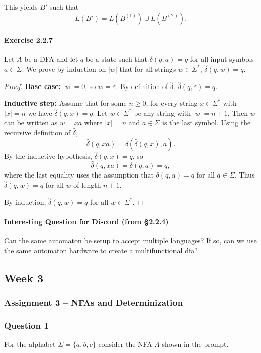 \documentclass[11pt, a4paper]{article}
\theoremstyle{definition}
\theoremstyle{remark}
\begin{document}
This yields $B'$ such that
\[
L(B') = L(B^{(1)}) \cup L(B^{(2)}).
\]


\paragraph{Exercise 2.2.7}
Let $A$ be a DFA and let $q$ be a state such that $\delta(q,a)=q$ for all input symbols $a\in\Sigma$.
We prove by induction on $|w|$ that for all strings $w\in\Sigma^*$, $\hat{\delta}(q,w)=q$.

\begin{proof}
\textbf{Base case:} $|w|=0$, so $w=\varepsilon$.
By definition of $\hat{\delta}$, $\hat{\delta}(q,\varepsilon)=q$.

\textbf{Inductive step:} Assume that for some $n\ge 0$, for every string $x\in\Sigma^*$ with $|x|=n$ we have $\hat{\delta}(q,x)=q$.
Let $w\in\Sigma^*$ be any string with $|w|=n+1$.
Then $w$ can be written as $w=xa$ where $|x|=n$ and $a\in\Sigma$ is the last symbol.
Using the recursive definition of $\hat{\delta}$,
\[
\hat{\delta}(q,xa)=\delta(\hat{\delta}(q,x),a).
\]
By the inductive hypothesis, $\hat{\delta}(q,x)=q$, so
\[
\hat{\delta}(q,xa)=\delta(q,a)=q,
\]
where the last equality uses the assumption that $\delta(q,a)=q$ for all $a\in\Sigma$.
Thus $\hat{\delta}(q,w)=q$ for all $w$ of length $n+1$.

By induction, $\hat{\delta}(q,w)=q$ for all $w\in\Sigma^*$.
\end{proof}

\paragraph{Interesting Question for Discord (from \S 2.2.4)}
Can the same automaton be setup to accept multiple languages? If so, can we use the same automaton hardware to create a multifunctional dfa?

\subsection{Week 3}
\subsubsection*{Assignment 3 -- NFAs and Determinization}

\subsubsection*{Question 1}
For the alphabet $\Sigma=\{a,b,c\}$ consider the NFA $A$ shown in the prompt.
\end{document}
